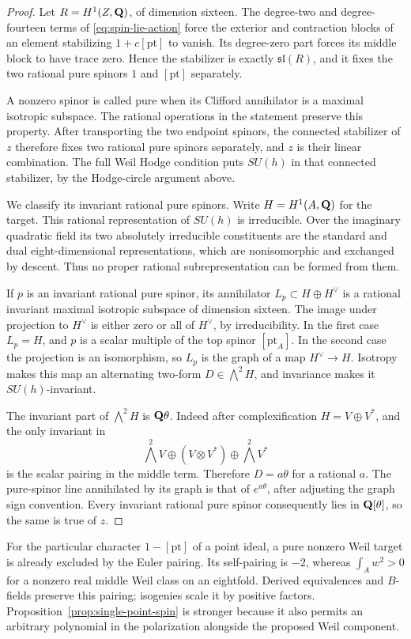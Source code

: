 \begin{proof}
Let $R=H^1(Z,\mathbf Q)$, of dimension sixteen. The degree-two and degree-fourteen terms of \eqref{eq:spin-lie-action} force the exterior and contraction blocks of an element stabilizing $1+c[\mathrm{pt}]$ to vanish. Its degree-zero part forces its middle block to have trace zero. Hence the stabilizer is exactly $\mathfrak{sl}(R)$, and it fixes the two rational pure spinors $1$ and $[\mathrm{pt}]$ separately.

A nonzero spinor is called pure when its Clifford annihilator is a maximal isotropic subspace. The rational operations in the statement preserve this property. After transporting the two endpoint spinors, the connected stabilizer of $z$ therefore fixes two rational pure spinors separately, and $z$ is their linear combination. The full Weil Hodge condition puts $SU(h)$ in that connected stabilizer, by the Hodge-circle argument above.

We classify its invariant rational pure spinors. Write $H=H^1(A,\mathbf Q)$ for the target. This rational representation of $SU(h)$ is irreducible. Over the imaginary quadratic field its two absolutely irreducible constituents are the standard and dual eight-dimensional representations, which are nonisomorphic and exchanged by descent. Thus no proper rational subrepresentation can be formed from them.

If $p$ is an invariant rational pure spinor, its annihilator $L_p\subset H\oplus H^\vee$ is a rational invariant maximal isotropic subspace of dimension sixteen. The image under projection to $H^\vee$ is either zero or all of $H^\vee$, by irreducibility. In the first case $L_p=H$, and $p$ is a scalar multiple of the top spinor $[\mathrm{pt}_A]$. In the second case the projection is an isomorphism, so $L_p$ is the graph of a map $H^\vee\to H$. Isotropy makes this map an alternating two-form $D\in\bigwedge^2H$, and invariance makes it $SU(h)$-invariant.

The invariant part of $\bigwedge^2H$ is $\mathbf Q\theta$. Indeed after complexification $H=V\oplus V^*$, and the only invariant in
\[
 \bigwedge^2V\oplus(V\otimes V^*)\oplus\bigwedge^2V^*
\]
is the scalar pairing in the middle term. Therefore $D=a\theta$ for a rational $a$. The pure-spinor line annihilated by its graph is that of $e^{a\theta}$, after adjusting the graph sign convention. Every invariant rational pure spinor consequently lies in $\mathbf Q[\theta]$, so the same is true of $z$.
\end{proof}

For the particular character $1-[\mathrm{pt}]$ of a point ideal, a pure nonzero Weil target is already excluded by the Euler pairing. Its self-pairing is $-2$, whereas $\int_Aw^2>0$ for a nonzero real middle Weil class on an eightfold. Derived equivalences and $B$-fields preserve this pairing; isogenies scale it by positive factors. Proposition~\ref{prop:single-point-spin} is stronger because it also permits an arbitrary polynomial in the polarization alongside the proposed Weil component.


